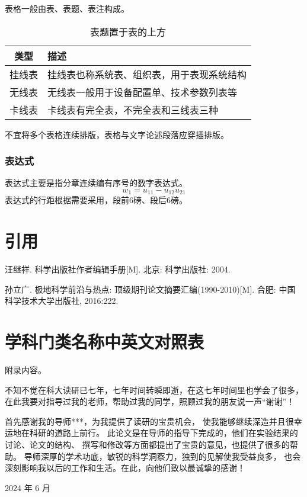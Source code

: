 表格一般由表、表题、表注构成。

\begin{table}[h]
  \centering
  \caption{表题置于表的上方}
  \label{tab:example}
  \begin{tabular}{cl}
    \toprule
    类型   & 描述                                       \\
    \midrule
    挂线表 & 挂线表也称系统表、组织表，用于表现系统结构 \\
    无线表 & 无线表一般用于设备配置单、技术参数列表等   \\
    卡线表 & 卡线表有完全表，不完全表和三线表三种       \\
    \bottomrule
  \end{tabular}
\end{table}

不宜将多个表格连续排版，表格与文字论述段落应穿插排版。

\clearpage

\subsection{表达式}

表达式主要是指分章连续编有序号的数字表达式。
\begin{equation}
  w_1 = u_{11} - u_{12} u_{21}
  \label{eq:example}
\end{equation}
表达式的行距根据需要采用，段前6磅、段后6磅。

\chapter{引用}
\cite{knuth86a}

\begin{thebibliography}{2}
汪继祥.
\newblock 科学出版社作者编辑手册[M].
\newblock 北京: 科学出版社: 2004.

孙立广.
\newblock 极地科学前沿与热点: 顶级期刊论文摘要汇编(1990-2010)[M].
\newblock 合肥: 中国科学技术大学出版社, 2016:222.

\end{thebibliography}

\appendix
\chapter{学科门类名称中英文对照表}
附录内容。

\backmatter
\begin{acknowledgements}
  不知不觉在科大读研已七年，七年时间转瞬即逝，在这七年时间里也学会了很多，
  在此我要对指导过我的老师，帮助过我的同学，照顾过我的朋友说一声“谢谢”！

  首先感谢我的导师***，为我提供了读研的宝贵机会，
  使我能够继续深造并且很幸运地在科研的道路上前行。
  此论文是在导师的指导下完成的，他们在实验结果的讨论、论文的结构、
  撰写和修改等方面都提出了宝贵的意见，也提供了很多的帮助。
  导师深厚的学术功底，敏锐的科学洞察力，独到的见解使我受益良多，
  也会深刻影响我以后的工作和生活。在此，向他们致以最诚挚的感谢！

  \hfill 2024 年 6 月
\end{acknowledgements}

